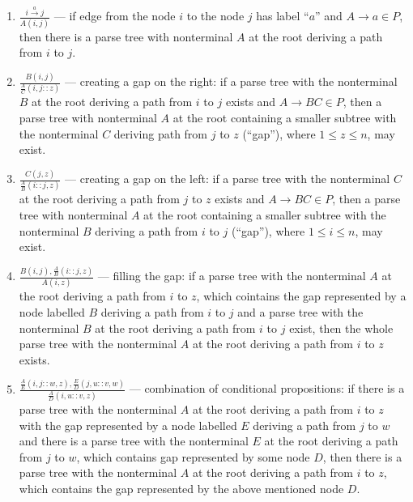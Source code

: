 \begin{enumerate}
\item $\frac{i \xrightarrow{a} j}{A(i , j)}$  --- if edge from the node $i$ to the node $j$ has label ``$a$'' and $A \rightarrow a \in P$, then there is a parse tree with nonterminal $A$ at the root deriving a path from $i$ to $j$.
\\
\item $\frac{B(i , j)}{\frac{A}{C}(i , j :: z)}$ --- creating a gap on the right: if a parse tree with the nonterminal $B$ at the root deriving a path from $i$ to $j$ exists and $A \rightarrow BC \in P$, then a parse tree with nonterminal $A$ at the root containing a smaller subtree with the nonterminal $C$ deriving path from $j$ to $z$ (``gap''), where $1 \le z \le n$, may exist.
\\
\item $\frac{C(j  , z)}{\frac{A}{B}(i :: j  , z)}$ --- creating a gap on the left: if a parse tree with the nonterminal $C$ at the root deriving a path from $j$ to $z$ exists and $A \rightarrow BC \in P$,  then a parse tree with nonterminal $A$ at the root containing a smaller subtree with the nonterminal $B$ deriving a path from $i$ to $j$ (``gap''), where $1 \le i \le n$, may exist.
\\
\item  $\frac{B(i, j), \frac{A}{B}(i :: j  , z)}{A(i, z)}$ --- filling the gap: if a parse tree with the nonterminal $A$ at the root deriving a path from $i$ to $z$, which cointains the gap represented by a node labelled $B$ deriving a path from $i$ to $j$ and a parse tree with the nonterminal $B$ at the root deriving a path from $i$ to $j$ exist, then the whole parse tree with the nonterminal $A$ at the root deriving a path from $i$ to $z$ exists.
\\
\item $\frac{\frac{A}{E}(i , j :: w, z), \frac{E}{D}( j , u :: v , w)}{\frac{A}{D}(i, u :: v , z)}$ --- combination of conditional propositions: if there is a parse tree with the nonterminal $A$ at the root deriving a path from $i$ to $z$ with the gap represented by a node labelled $E$ deriving a path from $j$ to $w$ and there is a parse tree with the nonterminal $E$ at the root deriving a path from $j$ to $w$, which contains gap represented by some node $D$, then there is a parse tree with the nonterminal $A$ at the root deriving a path from $i$ to $z$, which contains the gap represented by the above mentioned node $D$.
\end{enumerate}


